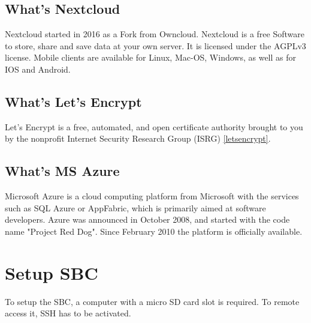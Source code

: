 \documentclass[a4paper,12pt]{article}
\begin{document}
	\subsection{What's Nextcloud}
	Nextcloud started in 2016 as a Fork from Owncloud. Nextcloud is a free Software to store, share and save data at your own server. It is licensed  under the AGPLv3 license. Mobile clients are available for Linux, Mac-OS, Windows, as well as for IOS and Android.
	\subsection{What's Let's Encrypt}
	Let's Encrypt is a free, automated, and open certificate authority brought to you by the nonprofit Internet Security Research Group (ISRG) \href{https://letsencrypt.org/}{[letsencrypt]}.
	\subsection{What's MS Azure}
	Microsoft Azure is a cloud computing platform from Microsoft with the services such as SQL Azure or AppFabric, which is primarily aimed at software developers. Azure was announced in October 2008, and started with the code name "Project Red Dog". Since February 2010 the platform is officially available.
	
	\section{Setup SBC}
	To setup the SBC, a computer with a micro SD card slot is required. To remote access it, SSH has to be activated.
\end{document}
